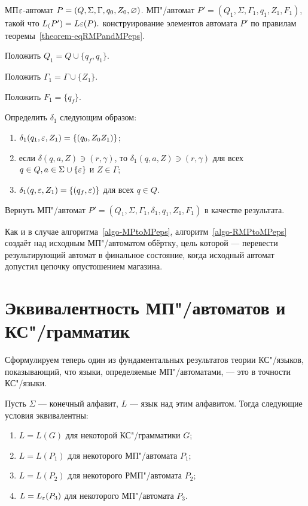 {\label{algo-RMPtoMPeps} МП$\varepsilon$-автомат $P = (Q, \Sigma, \Gamma, q_0, Z_0, \varnothing)$. }
{МП"/автомат $P' = (Q_1, \Sigma, \Gamma_1, q_1, Z_1, F_1)$, такой что $L_(P') = L\varepsilon(P).$}
{ конструирование элементов автомата $P'$ по правилам теоремы~\ref{theorem-eqRMPandMPeps}.}
{
\item Положить $Q_1 = Q \cup \{ q_f, q_1 \}$.

\item Положить $\Gamma_1 = \Gamma \cup \{Z_1\}$.

\item Положить $F_1 = \{q_f\}$.

\item Определить $\delta_1$ следующим образом:
	\begin{enumerate}
		\item $\delta_1(q_1, \varepsilon, Z_1) = \{ (q_0, Z_0Z_1) \}$;
		\item если $\delta(q, a, Z) \ni (r, \gamma)$, то $\delta_1(q, a, Z) \ni (r, \gamma)$ для всех $q \in Q, a \in \Sigma \cup \{ \varepsilon \}$ и $Z \in \Gamma$;
		\item $\delta_1(q, \varepsilon, Z_1) = \{ (q_f, \varepsilon) \}$ для всех $q \in Q$.
  \end{enumerate}  

\item Вернуть МП"/автомат $P' = (Q_1, \Sigma, \Gamma_1, \delta_1, q_1, Z_1, F_1)$ в качестве результата.
} 

Как и в случае алгоритма~\ref{algo-MPtoMPeps}, алгоритм~\ref{algo-RMPtoMPeps}  создаёт над исходным МП"/автоматом обёртку, цель которой --- перевести результирующий автомат в финальное состояние, когда исходный автомат допустил цепочку опустошением магазина. 

\section {Эквивалентность МП"/автоматов и КС"/грамматик}
\label{Chapter8GrammarEqFSM}

Сформулируем теперь один из фундаментальных результатов теории КС"/языков, показывающий, что языки, определяемые МП"/автоматами, --- это в точности КС"/языки.

\begin{mytheorem}
\label{theorem-eqKSandMP}
Пусть $\Sigma$ --- конечный алфавит, $L$ --- язык над этим алфавитом. Тогда следующие условия эквивалентны:
\begin{enumerate}
\item $L=L(G)$ для некоторой КС"/грамматики $G$;
\item $L=L(P_1)$ для некоторого МП"/автомата $P_1$;
\item $L=L(P_2)$ для некоторого РМП"/автомата $P_2$;
\item $L=L_\varepsilon(P_3)$ для некоторого МП"/автомата $P_3$.
\end{enumerate}
\end{mytheorem}

